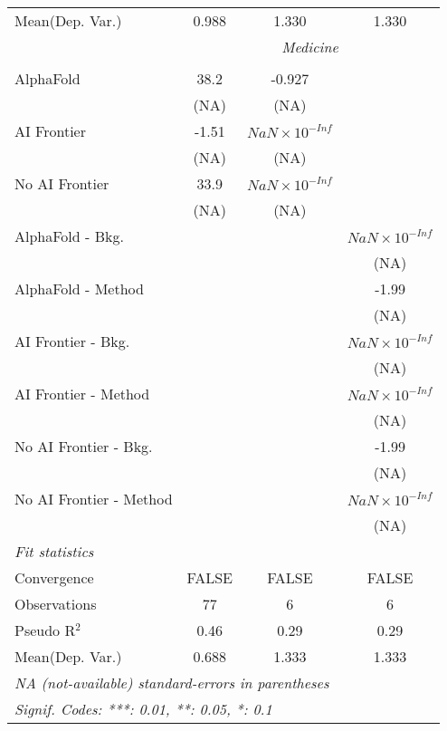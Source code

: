 \begin{tabular}{lccc}
Mean(Dep. Var.) & 0.988 & 1.330 & 1.330 \\
 & \multicolumn{3}{c}{\textit{Medicine}} \\ \\
   AlphaFold               & 38.2  & -0.927                 &   \\   
                           & (NA)  & (NA)                   &   \\   
   AI Frontier             & -1.51 & $NaN\times 10^{-Inf}$  &   \\   
                           & (NA)  & (NA)                   &   \\   
   No AI Frontier          & 33.9  & $NaN\times 10^{-Inf}$  &   \\   
                           & (NA)  & (NA)                   &   \\   
   AlphaFold - Bkg.        &       &                        & $NaN\times 10^{-Inf}$\\    
                           &       &                        & (NA)\\   
   AlphaFold - Method      &       &                        & -1.99\\   
                           &       &                        & (NA)\\   
   AI Frontier - Bkg.      &       &                        & $NaN\times 10^{-Inf}$\\    
                           &       &                        & (NA)\\   
   AI Frontier - Method    &       &                        & $NaN\times 10^{-Inf}$\\    
                           &       &                        & (NA)\\   
   No AI Frontier - Bkg.   &       &                        & -1.99\\   
                           &       &                        & (NA)\\   
   No AI Frontier - Method &       &                        & $NaN\times 10^{-Inf}$\\    
                           &       &                        & (NA)\\   
   \midrule
   \emph{Fit statistics}\\
   Convergence             &FALSE  & FALSE                  & FALSE\\  
   Observations            & 77    & 6                      & 6\\  
   Pseudo R$^2$            & 0.46  & 0.29                   & 0.29\\  
Mean(Dep. Var.) & 0.688 & 1.333 & 1.333 \\
   \midrule \midrule
   \multicolumn{4}{l}{\emph{NA (not-available) standard-errors in parentheses}}\\
   \multicolumn{4}{l}{\emph{Signif. Codes: ***: 0.01, **: 0.05, *: 0.1}}\\
\end{tabular}
\par\endgroup
